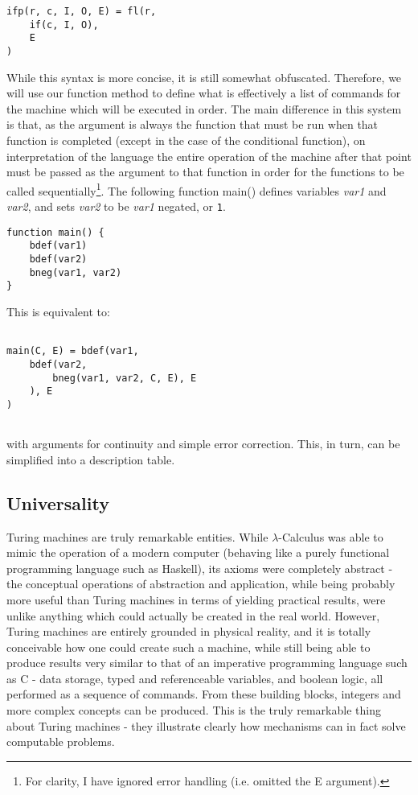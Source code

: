 \documentclass[Master.tex]{subfiles}
\begin{document}
\begin{lstlisting}
ifp(r, c, I, O, E) = fl(r,
    if(c, I, O),
    E
)
\end{lstlisting}
While this syntax is more concise, it is still somewhat obfuscated. Therefore, we will use our function method to define what is effectively a list of commands for the machine which will be executed in order. The main difference in this system is that, as the  argument is always the function that must be run when that function is completed (except in the case of the conditional function), on interpretation of the language the entire operation of the machine after that point must be passed as the  argument to that function in order for the functions to be called sequentially\footnote{For clarity, I have ignored error handling (i.e. omitted the E argument).}. The following function main() defines variables \textit{var1} and \textit{var2}, and sets \textit{var2} to be \textit{var1} negated, or \texttt{1}.

\begin{lstlisting}
function main() {
	bdef(var1)
	bdef(var2)
	bneg(var1, var2)
}
\end{lstlisting}
This is equivalent to:

\begin{lstlisting}

main(C, E) = bdef(var1,
    bdef(var2,
        bneg(var1, var2, C, E), E
    ), E
)


\end{lstlisting}
with arguments for continuity and simple error correction. This, in turn, can be simplified into a description table.

\subsection{Universality}

Turing machines are truly remarkable entities. While $\lambda$-Calculus was able to mimic the operation of a modern computer (behaving like a purely functional programming language such as Haskell), its axioms were completely abstract - the conceptual operations of abstraction and application, while being probably more useful than Turing machines in terms of yielding practical results, were unlike anything which could actually be created in the real world. However, Turing machines are entirely grounded in physical reality, and it is totally conceivable how one could create such a machine, while still being able to produce results very similar to that of an imperative programming language such as C - data storage, typed and referenceable variables, and boolean logic, all performed as a sequence of commands. From these building blocks, integers and more complex concepts can be produced. This is the truly remarkable thing about Turing machines - they illustrate clearly how mechanisms can in fact solve computable problems. 
\end{document}
